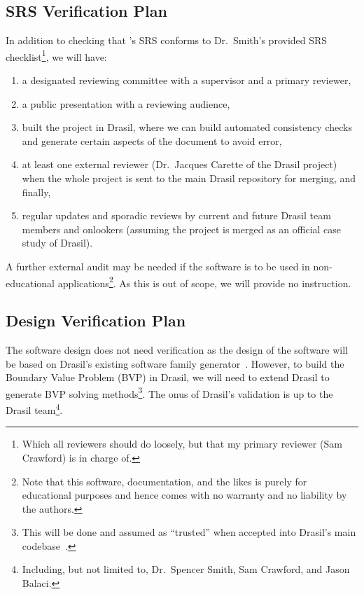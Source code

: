 \documentclass[12pt, titlepage]{article}
\begin{document}
\subsection{SRS Verification Plan}
\label{srs-verification-plan}

In addition to checking that \progname{}'s SRS conforms to Dr.\ Smith's provided
SRS checklist\footnote{Which all reviewers should do loosely, but that my
    primary reviewer (Sam Crawford) is in charge of.}, we will have:

\begin{enumerate}

    \item a designated reviewing committee with a supervisor and a primary
          reviewer,

    \item a public presentation with a reviewing audience,

    \item built the project in Drasil, where we can build automated consistency
          checks and generate certain aspects of the document to avoid error,

    \item at least one external reviewer (Dr.\ Jacques Carette of the Drasil
          project) when the whole \progname{} project is sent to the main Drasil
          repository for merging, and finally,

    \item regular updates and sporadic reviews by current and future Drasil team
          members and onlookers (assuming the project is merged as an official
          case study of Drasil).

\end{enumerate}

A further external audit may be needed if the software is to be used in
non-educational applications\footnote{Note that this software, documentation,
    and the likes is purely for educational purposes and hence comes with no
    warranty and no liability by the authors.}. As this is out of scope, we will
provide no instruction.

\subsection{Design Verification Plan}

The software design does not need verification as the design of the software
will be based on Drasil's existing software family generator~\cite{Drasil2023}.
However, to build the Boundary Value Problem (BVP) in Drasil, we will need to
extend Drasil to generate BVP solving methods\footnote{This will be done and
assumed as ``trusted'' when accepted into Drasil's main
codebase~\cite{Drasil2023}.}. The onus of Drasil's validation is up to the
Drasil team\footnote{Including, but not limited to, Dr.\ Spencer Smith, Sam
Crawford, and Jason Balaci.}.
\end{document}
